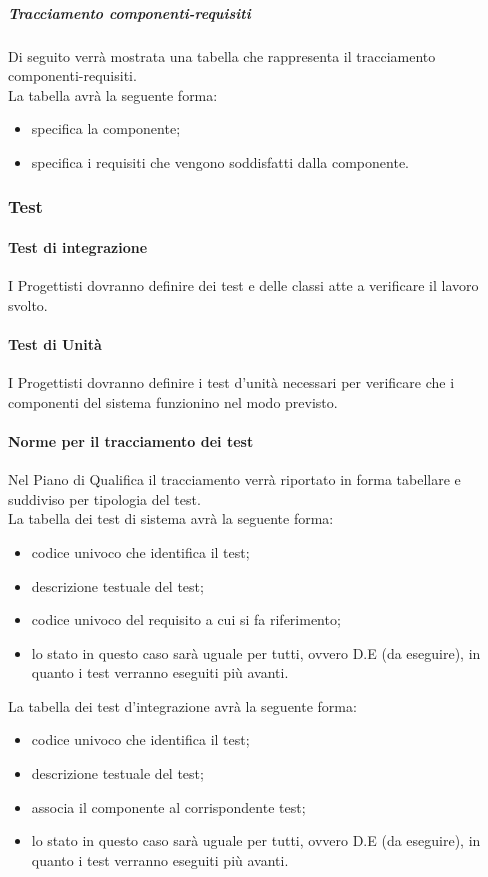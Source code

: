 \subparagraph{Tracciamento componenti-requisiti}
Di seguito verrà mostrata una tabella che rappresenta il tracciamento componenti-requisiti. \\
La tabella avrà la seguente forma:
\begin{itemize}
\item {}specifica la componente;
\item {}specifica i requisiti che vengono soddisfatti dalla componente.
\end{itemize}

\subsubsection{Test}

\paragraph{Test di integrazione}
\label{}
I Progettisti dovranno definire dei test e delle classi atte a verificare il lavoro svolto.

\paragraph{Test di Unità}
\label{}
I Progettisti dovranno definire i test d'unità necessari per verificare che i componenti del sistema funzionino nel modo previsto.

\paragraph{Norme per il tracciamento dei test}
Nel Piano di Qualifica il tracciamento verrà riportato in forma tabellare e suddiviso per tipologia del test.\\
La tabella dei test di sistema avrà la seguente forma:
\begin{itemize}
\item {}codice univoco che identifica il test;
\item {} descrizione testuale del test;
\item {}codice univoco del requisito a cui si fa riferimento;
\item {}lo stato in questo caso sarà uguale per tutti, ovvero D.E (da eseguire), in quanto i test verranno eseguiti più avanti.
\end{itemize}
La tabella dei test d'integrazione avrà la seguente forma:
\begin{itemize}
\item {}codice univoco che identifica il test;
\item {} descrizione testuale del test;
\item {} associa il componente al corrispondente test;
\item {}lo stato in questo caso sarà uguale per tutti, ovvero D.E (da eseguire), in quanto i test verranno eseguiti più avanti.
\end{itemize}

